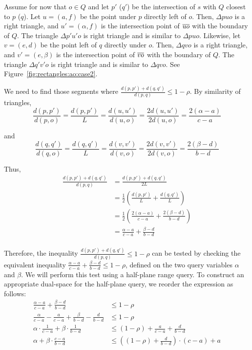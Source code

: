 Assume for now that $o \in Q$ and let $p'$ ($q'$) be the intersection of $s$ with $Q$ closest to $p$ ($q$).  Let $u = (a, f)$ be the point under $p$ directly left of $o$. Then, $\Delta p u o$ is a right triangle, and $u' = (\alpha, f)$ is the intersection point of $\overline{u o}$ with the boundary of $Q$.  The triangle $\Delta p' u' o$ is right triangle and is similar to $\Delta p u o$. Likewise, let $v = (e, d)$ be the point left of $q$ directly under $o$. Then, $\Delta q v o$ is a right triangle, and $v' = (e, \beta)$ is the intersection point of $\overline{v o}$ with the boundary of $Q$. The triangle $\Delta q' v' o$ is right triangle and is similar to $\Delta q v o$. See Figure~\ref{fig:rectangles:ao:case2}.

We need to find those segments where $\frac{d(p, p') + d(q, q')}{d(p, q)} \leq 1 - \rho$. By similarity of triangles, 
\[ 
\frac{d(p, p')}{d(p, o)} = \frac{d(p, p')}{L} = \frac{d(u, u')}{d(u, o)} =  \frac{2 d(u, u')}{2 d(u, o)} = \frac{2(\alpha - a)}{c - a}
\]

\noindent and 
\[ 
\frac{d(q, q')}{d(q, o)} = \frac{d(q, q')}{L} = \frac{d(v, v')}{d(v, o)} = \frac{2 d(v, v')}{2 d(v, o)} = \frac{2(\beta - d)}{b - d}
\]

\noindent Thus,
\[
\begin{split} 
\frac{d(p, p') + d(q, q')}{d(p, q)}
%
&= \frac{d(p, p') + d(q, q')}{2L} \\
%
&= \frac{1}{2} \left ( \frac{d(p, p')}{L} + \frac{d(q, q')}{L} \right ) \\
%
&= \frac{1}{2} \left ( \frac{2(\alpha - a)}{c - a} + \frac{2(\beta - d)}{b - d} \right ) \\
%
&= \frac{\alpha - a}{c - a} + \frac{\beta - d}{b - d} \\
%
\end{split}
\]

Therefore, the inequality $\frac{d(p, p') + d(q, q')}{d(p, q)} \leq 1 - \rho$ can be tested by checking the equivalent inequality $\frac{\alpha - a}{c - a} + \frac{\beta - d}{b - d} \leq 1 - \rho$, defined on the two query variables $\alpha$ and $\beta$. We will perform this test using a half-plane range query. To construct an appropriate dual-space for the half-plane query, we reorder the expression as follows:
\[
\begin{split}
\frac{\alpha - a}{c - a} + \frac{\beta - d}{b - d} &\leq 1 - \rho \\
%
\frac{\alpha}{c-a} - \frac{a}{c-a} + \frac{\beta}{b-d} - \frac{d}{b-d} &\leq 1 - \rho \\
%
\alpha \cdot \frac{1}{c-a} + \beta \cdot \frac{1}{b-d} &\leq (1 - \rho) + \frac{a}{c-a} + \frac{d}{b-d} \\
%
\alpha + \beta \cdot \frac{c-a}{b-d} &\leq \left ( (1 - \rho) + \frac{d}{b-d} \right ) \cdot (c-a) + a \\
%
\end{split}
\]

